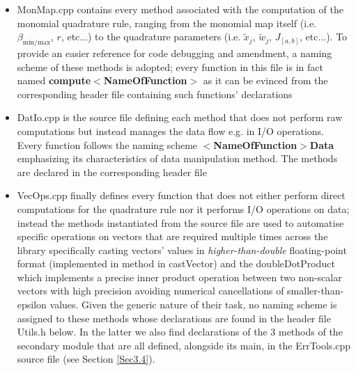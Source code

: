 \documentclass[a4paper, twosided]{book}
\begin{document}
\begin{itemize}
    \item \colorbox{poliGrayBlue}{MonMap.cpp} contains every method associated with the computation of the monomial quadrature rule, ranging from the monomial map itself (i.e. $\beta_{\text{min/max}}$, $r$, etc...) to the quadrature parameters (i.e. $\tilde{x}_j$, $\tilde{w}_j$, $J_{[a,b]}$, etc...). To provide an easier reference for code debugging and amendment, a naming scheme of these methods is adopted; every function in this file is in fact named \color{poliDarkBlue} \textbf{compute}$\boldsymbol{<}$\textbf{NameOfFunction$\boldsymbol{>}$} \color{black} as it can be evinced from the corresponding header file containing such functions' declarations
                 
    \item \colorbox{poliGrayBlue}{DatIo.cpp} is the source file defining each method that does not perform raw computations but instead manages the data flow e.g. in I/O operations. Every function follows the naming scheme \color{poliDarkBlue} $\boldsymbol{<}$\textbf{NameOfFunction$\boldsymbol{>}$}\textbf{Data} \color{black} emphasizing its characteristics of data manipulation method. The methods are declared in the corresponding header file
    \vspace{0.5cm}
    \vspace{0.5cm}
    \item \colorbox{poliGrayBlue}{VecOps.cpp} finally defines every function that does not either perform direct computations for the quadrature rule nor it performs I/O operations on data; instead the methods instantiated from the source file are used to automatise specific operations on vectors that are required multiple times across the library specifically casting vectors' values in \textsl{higher-than-double} floating-point format (implemented in method in \colorbox{poliGrayBlue}{castVector}) and the \colorbox{poliGrayBlue}{doubleDotProduct} which implements a precise inner product operation between two non-scalar vectors with high precision avoiding numerical cancellations of smaller-than-epsilon values. Given the generic nature of their task, no naming scheme is assigned to these methods whose declarations are found in the header file \colorbox{poliGrayBlue}{Utils.h} below. In the latter we also find declarations of the $3$ methods of the secondary module that are all defined, alongside its \colorbox{poliGrayBlue}{main}, in the \colorbox{poliGrayBlue}{ErrTools.cpp} source file (see Section \ref{Sec3.4}).
    

\end{itemize}
\end{document}
